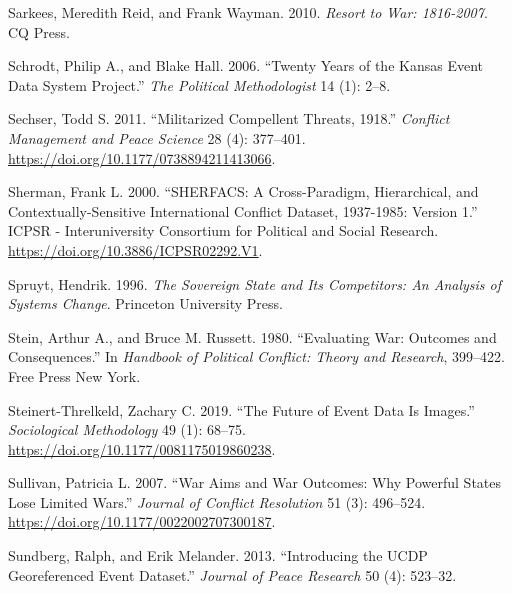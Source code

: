 \documentclass{article}
\newlength{\cslhangindent}
\newlength{\cslentryspacingunit} %
\newenvironment{CSLReferences}[2] %
 {%
  \setlength{\parindent}{0pt}
  \ifodd #1
  \let\oldpar\par
  \def\par{\hangindent=\cslhangindent\oldpar}
  \fi
  \setlength{\parskip}{#2\cslentryspacingunit}
 }%
 {}
\begin{document}
\begin{CSLReferences}{1}{0}
\leavevmode{}%
Sarkees, Meredith Reid, and Frank Wayman. 2010. \emph{Resort to War:
1816-2007}. {CQ Press}.

\leavevmode{}%
Schrodt, Philip A., and Blake Hall. 2006. {``Twenty Years of the
{Kansas} Event Data System Project.''} \emph{The Political
Methodologist} 14 (1): 2--8.

\leavevmode{}%
Sechser, Todd S. 2011. {``Militarized {Compellent Threats},
1918.''} \emph{Conflict Management and Peace Science} 28
(4): 377--401. \url{https://doi.org/10.1177/0738894211413066}.

\leavevmode{}%
Sherman, Frank L. 2000. {``{SHERFACS}: {A Cross-Paradigm},
{Hierarchical}, and {Contextually-Sensitive International Conflict
Dataset}, 1937-1985: {Version} 1.''} {ICPSR - Interuniversity Consortium
for Political and Social Research}.
\url{https://doi.org/10.3886/ICPSR02292.V1}.

\leavevmode{}%
Spruyt, Hendrik. 1996. \emph{The {Sovereign State} and {Its
Competitors}: {An Analysis} of {Systems Change}}. {Princeton University
Press}.

\leavevmode{}%
Stein, Arthur A., and Bruce M. Russett. 1980. {``Evaluating War:
{Outcomes} and Consequences.''} In \emph{Handbook of Political Conflict:
Theory and Research}, 399--422. {Free Press New York}.

\leavevmode{}%
Steinert-Threlkeld, Zachary C. 2019. {``The {Future} of {Event Data Is
Images}.''} \emph{Sociological Methodology} 49 (1): 68--75.
\url{https://doi.org/10.1177/0081175019860238}.

\leavevmode{}%
Sullivan, Patricia L. 2007. {``War {Aims} and {War Outcomes}: {Why
Powerful States Lose Limited Wars}.''} \emph{Journal of Conflict
Resolution} 51 (3): 496--524.
\url{https://doi.org/10.1177/0022002707300187}.

\leavevmode{}%
Sundberg, Ralph, and Erik Melander. 2013. {``Introducing the {UCDP}
Georeferenced Event Dataset.''} \emph{Journal of Peace Research} 50 (4):
523--32.


\end{CSLReferences}
\end{document}
